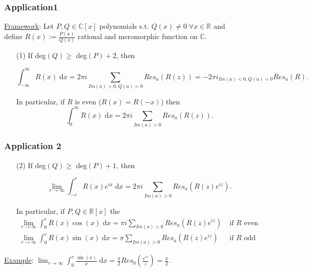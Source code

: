\documentclass[10pt]{beamer}
\newcommand{\R}{\mathbb{R}}
\newcommand{\C}{\mathbb{C}}
\begin{document}
{\begin{frame} \frametitle{Application1}
\underline{Framework}: Let $P,Q \in \C[x]$ polynomials s.t. $Q(x) \neq 0\; \forall x \in \R$ and \\
define $R(x):=\frac{P(x)}{Q(x)}$ rational and meromorphic function on $\C$.\\
\vspace{0.2cm}
\begin{itemize}
\item[(1)] If deg$(Q) \geq$ deg$(P)+2$, then
\begin{block}{}
$$\int_{-\infty}^\infty R(x)\; \text{d}x=2\pi i \sum_{Im(a)>0, Q(a)=0} Res_a(R(z))=-2\pi i _{Im(a)<0, Q(a)=0} Res_a(R).$$
\end{block}
In particular, if $R$ is even ($R(x)=R(-x)$) then
$$\int_{0}^\infty R(x)\; \text{d}x=2\pi i \sum_{Im(a)>0} Res_a(R(z)).$$
\end{itemize}
\end{frame}


\begin{frame} \frametitle{Application 2}
\begin{itemize}
\item[(2)] If deg$(Q) \geq$ deg$(P)+1$, then
\begin{block}{}
$$\lim_{r\rightarrow \infty} \int_{-r}^r R(x) e^{ix}\; \text{d}x=2\pi i \sum_{Im(a)>0} Res_a(R(z)e^{iz}).$$
\end{block}
In particular, if $P,Q\in \R[x]$ the
\begin{eqnarray*}
\lim_{r\rightarrow \infty} \int_{0}^r R(x) \cos(x)\; \text{d}x=\pi i \sum_{Im(a)>0} Res_a(R(z)e^{iz}) &\; \text{if } R \text{ even}& \\
\lim_{r\rightarrow \infty} \int_{0}^r R(x) \sin(x)\; \text{d}x=\pi \sum_{Im(a)>0} Res_a(R(z)e^{iz}) &\; \text{if } R \text{ odd}&
\end{eqnarray*}
\end{itemize}
\underline{Example}: $\lim_{r\rightarrow \infty} \int_{0}^r \frac{\sin(x)}{x}\; \text{d}x=\frac{\pi}{2} Res_0(\frac{e^{iz}}{z}) =\frac{\pi}{2}.$
\end{frame}

}
\end{document}
